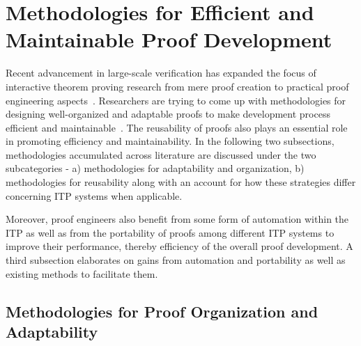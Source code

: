 \section{Methodologies for Efficient and Maintainable Proof Development}
\label{sec:proofDev}




Recent advancement in large-scale verification has expanded the focus of interactive theorem proving research from mere proof creation to practical proof engineering aspects~\cite{Curzon_1995}. Researchers are trying to come up with methodologies for designing well-organized and adaptable proofs to make development process efficient and maintainable~\cite{Kaivola_et_al_2003, Woos_et_al_2016, Curzon_1995}. The reusability of proofs also plays an essential role in promoting efficiency and maintainability. In the following two subsections, methodologies accumulated across literature are discussed under the two subcategories - a) methodologies for adaptability and organization, b) methodologies for reusability along with an account for how these strategies differ concerning ITP systems when applicable.

Moreover, proof engineers also benefit from some form of automation within the ITP as well as from the portability of proofs among different ITP systems to improve their performance, thereby efficiency of the overall proof development. A third subsection elaborates on gains from automation and portability as well as existing methods to facilitate them.

\subsection{Methodologies for Proof Organization and Adaptability}

